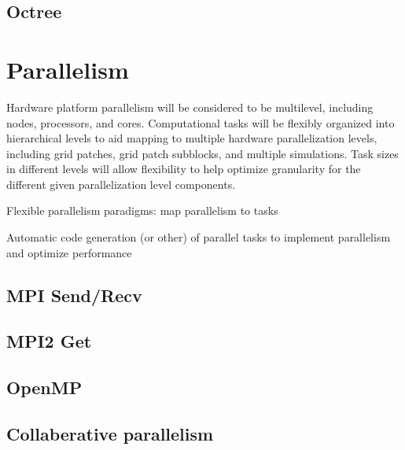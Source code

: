 \documentclass{book}
\begin{document}
\subsection{Octree}

\section{Parallelism}

Hardware platform parallelism will be considered to be multilevel,
including nodes, processors, and cores.  Computational tasks will be
flexibly organized into hierarchical levels to aid mapping to multiple
hardware parallelization levels, including grid patches, grid patch
subblocks, and multiple simulations.  Task sizes in different levels
will allow flexibility to help optimize granularity for the different
given parallelization level components.

Flexible parallelism paradigms: map parallelism to tasks

Automatic code generation (or other) of parallel tasks to implement
parallelism and optimize performance

\subsection{MPI Send/Recv}

\subsection{MPI2 Get}

\subsection{OpenMP}

\subsection{Collaberative parallelism}
\end{document}
